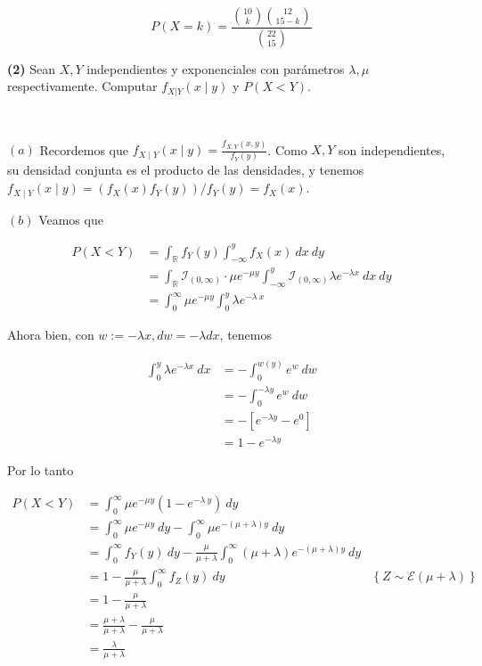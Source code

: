 \documentclass[a4paper, 12pt]{article}
\begin{document}
\begin{equation*}
  P(X = k) = \frac{\binom{10}{k} \binom{12}{15 - k}}{\binom{22}{15}}
\end{equation*}




\pagebreak 

\begin{myframe}
\textbf{(2)} Sean $X, Y$ independientes y exponenciales con parámetros $\lambda,
\mu$ respectivamente. Computar $f_{X | Y}(x \mid y)$ y $P(X < Y)$.
\end{myframe}

~


  $(a)$ Recordemos que $f_{X \mid Y}(x \mid y) = \frac{f_{X, Y}(x,
  y)}{f_Y(y)}$. Como $X, Y$ son independientes, su densidad conjunta es el
  producto de las densidades, y tenemos $f_{X \mid Y}(x \mid y) = (f_X(x)
  f_Y(y))/f_Y(y) = f_X(x)$.

  $(b)$ Veamos que

  \begin{align*}
    P(X < Y) 
    &= \int_{\mathbb{R}} f_Y(y) \int_{-\infty}^y f_X(x) ~ dx ~ dy \\ 
    &=\int_\mathbb{R} \mathcal{I}_{(0, \infty)} \cdot \mu e^{-\mu y}
    \int_{-\infty}^y \mathcal{I}_{(0, \infty)} \lambda e^{-\lambda x} ~ dx ~ dy
    \\ 
    &=\int_0^\infty \mu e^{-\mu y}\int_0^y \lambda e^{-\lambda ~ x}
  \end{align*}

Ahora bien, con $w := -\lambda x, dw = -\lambda dx$, tenemos

\begin{align*}
  \int_0^y \lambda e^{-\lambda x} ~ dx 
  &= -\int_0^{w(y)}  e^w ~ dw \\ 
  &=-\int_0^{-\lambda y} e^w ~ dw \\ 
  &= - \left[ e^{-\lambda y} - e^0 \right] \\ 
  &=1 - e^{- \lambda y}
\end{align*}

Por lo tanto

\begin{align*}
P(X < Y) 
  &= \int_0^\infty \mu e^{-\mu y} \left( 1 - e^{-\lambda ~ y} \right) ~ dy \\ 
  &= \int_0^\infty \mu e^{-\mu y} ~ dy - \int_0^\infty \mu e^{-(\mu + \lambda) y
  } ~ dy \\ 
  &= \int_0^\infty f_{Y}(y) ~ dy - \frac{\mu}{\mu + \lambda}\int_0^\infty (\mu +
  \lambda)e^{-(\mu + \lambda) y} ~ dy \\ 
  &= 1 - \frac{\mu}{\mu + \lambda} \int_0^\infty f_{Z}(y) ~ dy &\left\{ Z \sim
  \mathcal{E}(\mu + \lambda) \right\}  \\ 
  &= 1 - \frac{\mu}{\mu + \lambda} \\ 
  &= \frac{\mu + \lambda}{\mu + \lambda} - \frac{\mu}{\mu + \lambda} \\ 
  &= \frac{\lambda}{\mu + \lambda}
\end{align*}
\end{document}
